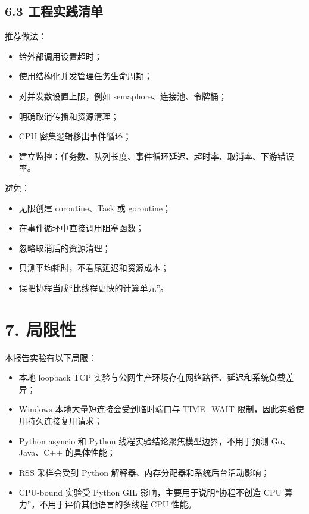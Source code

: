 \documentclass[
  11pt,
  a4paper,
]{article}
\providecommand{\tightlist}{%
  \setlength{\itemsep}{0pt}\setlength{\parskip}{0pt}}
\begin{document}
\subsection{6.3
工程实践清单}\label{ux5de5ux7a0bux5b9eux8df5ux6e05ux5355}

推荐做法：

\begin{itemize}
\tightlist
\item
  给外部调用设置超时；
\item
  使用结构化并发管理任务生命周期；
\item
  对并发数设置上限，例如 semaphore、连接池、令牌桶；
\item
  明确取消传播和资源清理；
\item
  CPU 密集逻辑移出事件循环；
\item
  建立监控：任务数、队列长度、事件循环延迟、超时率、取消率、下游错误率。
\end{itemize}


避免：

\begin{itemize}
\tightlist
\item
  无限创建 coroutine、Task 或 goroutine；
\item
  在事件循环中直接调用阻塞函数；
\item
  忽略取消后的资源清理；
\item
  只测平均耗时，不看尾延迟和资源成本；
\item
  误把协程当成``比线程更快的计算单元''。
\end{itemize}

\section{7. 局限性}\label{ux5c40ux9650ux6027}

本报告实验有以下局限：

\begin{itemize}
\tightlist
\item
  本地 loopback TCP 实验与公网生产环境存在网络路径、延迟和系统负载差异；
\item
  Windows 本地大量短连接会受到临时端口与 TIME\_WAIT
  限制，因此实验使用持久连接复用请求；
\item
  Python asyncio 和 Python 线程实验结论聚焦模型边界，不用于预测
  Go、Java、C++ 的具体性能；
\item
  RSS 采样会受到 Python 解释器、内存分配器和系统后台活动影响；
\item
  CPU-bound 实验受 Python GIL 影响，主要用于说明``协程不创造 CPU
  算力''，不用于评价其他语言的多线程 CPU 性能。
\end{itemize}
\end{document}
